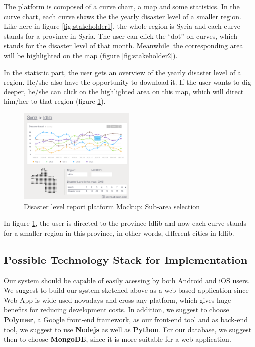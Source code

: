 The platform is composed of a curve chart,
a map and some statistics.
In the curve chart,
each curve shows the the yearly disaster level of a smaller region.
Like here in figure \ref{fig:stakeholder1}, 
the whole region is Syria and each curve stands for a province in Syria.
The user can click the ``dot'' on curves,
which stands for the disaster level of that month.
Meanwhile, the corresponding area will be highlighted on the map (figure \ref{fig:stakeholder2}).

In the statistic part,
the user gets an overview of the yearly disaster level of a region.
He/she also have the opportunity to download it.
If the user wants to dig deeper, 
he/she can click on the highlighted area on this map,
which will direct him/her to that region (figure \ref{fig:stakeholder3}).

\begin{figure}[H]
\centering
\includegraphics[width=0.5\textwidth]{figures/function-stakeholder-3}
\caption{Disaster level report platform Mockup: Sub-area selection}
\label{fig:stakeholder3}
\end{figure}

In figure \ref{fig:stakeholder3},
the user is directed to the province ldlib and now each curve stands for a smaller region in this province,
in other words, different cities in ldlib.
    
\subsection{Possible Technology Stack for Implementation}

Our system should be capable of easily acessing by both Android and iOS users.
We suggest to build our system sketched above as a web-based application 
since Web App is wide-used nowadays and cross any platform, which gives huge benefits for 
reducing development costs. 
In addition, we suggest to choose \textbf{Polymer}, a Google front-end framework, 
as our front-end tool and as back-end tool, we suggest to use \textbf{Nodejs} as well as \textbf{Python}.
For our database, we suggest then to choose \textbf{MongoDB}, since it is more suitable for a web-application.